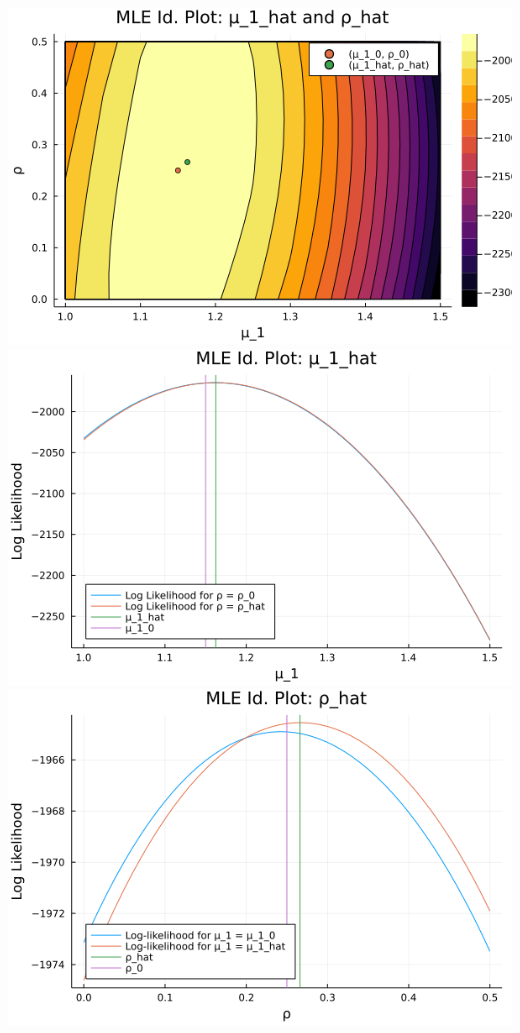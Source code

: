 \documentclass{article}
\begin{document}
\begin{enumerate}
\begin{enumerate}
\begin{center}
\includegraphics[scale =0.5]{q_f_3d}
\includegraphics[scale =0.5]{q_f_mu_1}
\includegraphics[scale =0.5]{q_f_rho}
\end{center}


\end{enumerate}
\end{enumerate}
\end{document}
